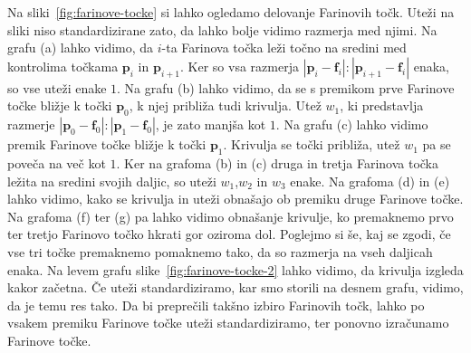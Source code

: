 \documentclass[isrm2, tisk]{fmfdelo}
\newcommand{\p}{\mathbf{p}}
\begin{document}
    Na sliki~\ref{fig:farinove-tocke} si lahko ogledamo delovanje Farinovih točk.
    Uteži na sliki niso standardizirane zato, da lahko bolje vidimo razmerja med njimi.
    Na grafu (a) lahko vidimo, da $i$-ta Farinova točka leži točno na sredini med kontrolima točkama $\p_i$ in $\p_{i+1}$.
    Ker so vsa razmerja $|\p_i-\mathbf{f}_i|:|\p_{i+1}-\mathbf{f}_i|$ enaka, so vse uteži enake $1$.
    Na grafu (b) lahko vidimo, da se s premikom prve Farinove točke bližje k točki $\p_0$, k njej približa tudi krivulja.
    Utež $w_1$, ki predstavlja razmerje $|\p_0-\mathbf{f}_0|:|\p_{1}-\mathbf{f}_0|$, je zato manjša kot $1$.
    Na grafu (c) lahko vidimo premik Farinove točke bližje k točki $\p_1$.
    Krivulja se točki približa, utež $w_1$ pa se poveča na več kot $1$.
    Ker na grafoma (b) in (c) druga in tretja Farinova točka ležita na sredini svojih daljic, so uteži $w_1$,$w_2$ in $w_3$ enake.
    Na grafoma (d) in (e) lahko vidimo, kako se krivulja in uteži obnašajo ob premiku druge Farinove točke.
    Na grafoma (f) ter (g) pa lahko vidimo obnašanje krivulje, ko premaknemo prvo ter tretjo Farinovo točko hkrati gor oziroma dol.
    Poglejmo si še, kaj se zgodi, če vse tri točke premaknemo pomaknemo tako, da so razmerja na vseh daljicah enaka.
    Na levem grafu slike~\ref{fig:farinove-tocke-2} lahko vidimo, da krivulja izgleda kakor začetna.
    Če uteži standardiziramo, kar smo storili na desnem grafu, vidimo, da je temu res tako.
    Da bi preprečili takšno izbiro Farinovih točk, lahko po vsakem premiku Farinove točke uteži standardiziramo, ter ponovno izračunamo Farinove točke.
\end{document}

